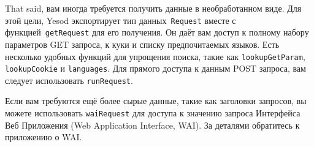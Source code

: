 That said,
вам иногда требуется получить данные в необработанном
виде. Для этой цели, Yesod экспортирует тип данных~\lstinline!Request!
вместе с функцией~\lstinline!getRequest! для его получения. Он даёт
вам доступ к полному набору параметров GET запроса, к куки и списку
предпочитаемых языков. Есть несколько удобных функций для упрощения
поиска, такие как \lstinline!lookupGetParam!, \lstinline!lookupCookie!
и \lstinline!languages!. Для прямого доступа к данным POST запроса,
вам следует использовать \lstinline!runRequest!.

Если вам требуются ещё более сырые данные, такие как заголовки
запросов, вы можете использовать \lstinline!waiRequest! для доступа к
значению запроса Интерфейса Веб Приложения (Web Application Interface,
WAI). За деталями обратитесь к приложению о WAI.

